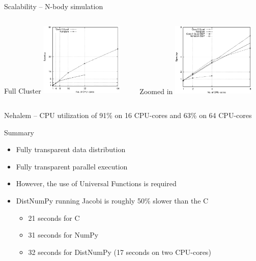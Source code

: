 \documentclass{beamer}
\begin{document}

\begin{frame}{Scalability -- N-body simulation}
\begin{scriptsize}
\begin{columns}
  \begin{column}{0.5\textwidth}
  \begin{center}
    \hspace{21px}Full Cluster
    \includegraphics[width=150px]{../gfx/NbodyStrong}
  \end{center}
  \end{column}
  \begin{column}{0.5\textwidth}
  \begin{center}
    \hspace{23px}Zoomed in
    \includegraphics[width=150px]{../gfx/NbodyStrongSMP}
  \end{center}
  \end{column}
\end{columns}
\begin{center}
Nehalem -- CPU utilization of 91\% on 16 CPU-cores and 63\% on 64 CPU-cores
\end{center}
\end{scriptsize}
\end{frame}


\begin{frame}{Summary}
\begin{itemize}
  \item Fully transparent data distribution
  \item Fully transparent parallel execution
  \item However, the use of Universal Functions is required
  \item DistNumPy running Jacobi is roughly 50\% slower than the C
  \begin{itemize}
    \item 21 seconds for C
    \item 31 seconds for NumPy
    \item 32 seconds for DistNumPy (17 seconds on two CPU-cores)
  \end{itemize}
\end{itemize}
\end{frame}
\end{document}
